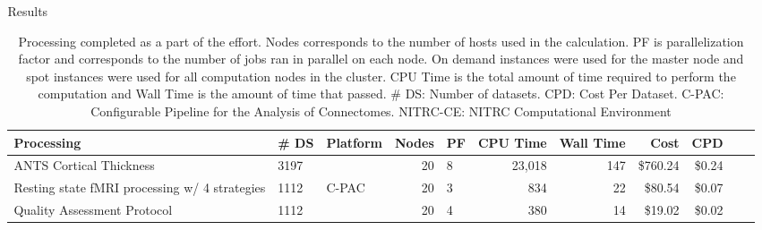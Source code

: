 \documentclass[final,hyperref={pdfpagelabels=false}]{beamer}
\newlength{\columnheight}
\begin{document}
\begin{frame}
\begin{columns}
\begin{column}{.5\textwidth}
    \end{column}
    \begin{column}{.5\textwidth}
        \parbox[t][\columnheight]{\textwidth}{ %
        \begin{block}{Results}
            \begin{center}
                \begin{table}
                    \caption{Processing completed as a part of the effort. Nodes corresponds to the number of hosts used in the calculation. PF is parallelization factor and corresponds to the number of jobs ran in parallel on each node. On demand instances were used for the master node and spot instances were used for all computation nodes in the cluster. CPU Time is the total amount of time required to perform the computation and Wall Time is the amount of time that passed. \# DS: Number of datasets. CPD: Cost Per Dataset. C-PAC: Configurable Pipeline for the Analysis of Connectomes. NITRC-CE: NITRC Computational Environment}
                    \begin{tabularx}{\textwidth}{XXlrl*{6}{r}}
                        {\bf Processing} & {\bf \# DS} & {\bf Platform} & {\bf Nodes} & {\bf PF} & {\bf CPU Time} & {\bf Wall Time} & {\bf Cost} & {\bf CPD}\\
                        \hline
                        ANTS Cortical Thickness & 3197 &  & 20 & 8 & 23,018 & 147 & \$760.24 & \$0.24\\
                        Resting state fMRI processing w/ 4 strategies & 1112 & C-PAC  & 20 & 3 & 834 & 22 & \$80.54 & \$0.07\\
                        Quality Assessment Protocol & 1112 & & 20 & 4 & 380 & 14 & \$19.02 & \$0.02\\

\end{tabularx}
\end{table}
\end{center}
\end{block}}
\end{column}
\end{columns}
\end{frame}
\end{document}
